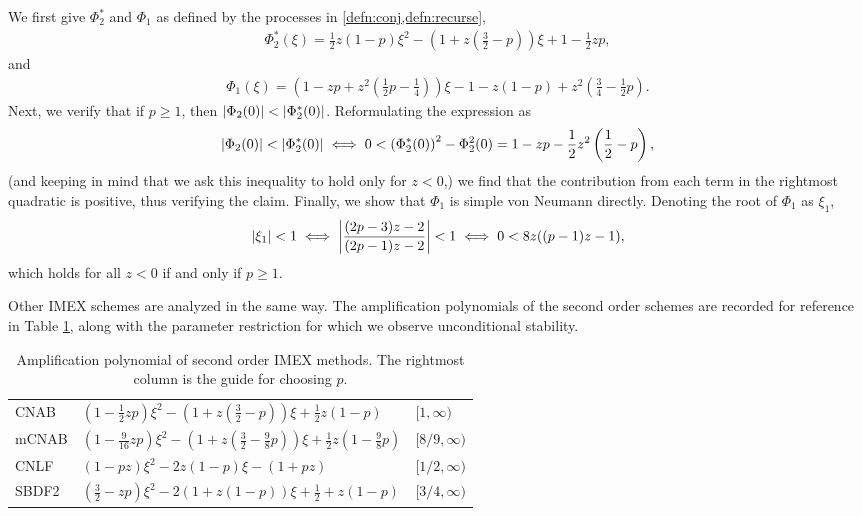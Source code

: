 We first give $\Phi_2^*$ and $\Phi_1$ as defined by the processes in \cref{defn:conj,defn:recurse},  
\begin{align}
\Phi_2^*(\xi) = \frac{1}{2}z(1-p) \xi^2 
- \left(1 + z\left(\frac{3}{2} - p \right)\right) \xi
+ 1 - \frac{1}{2}zp, 
\end{align}
and
\begin{align} 
\Phi_1(\xi) = \left(1 - zp + z^2 \left( \frac{1}{2} p - \frac{1}{4} \right) \right)\xi -1 - z(1-p) + z^2 \left( \frac{3}{4} - \frac{1}{2}p \right).
\end{align}
Next, we verify that if $p\geq 1$, then $\left|\Phi_2(0)\right| < \left|\Phi^*_2(0)\right|$. Reformulating the expression as
\begin{align*}
\left|\Phi_2(0)\right| < \left|\Phi^*_2(0)\right| 
\iff 
0 < \left(\Phi^*_2(0) \right)^2 - \Phi^2_2(0)
= 1 - zp - \frac{1}{2}z^2\left( \frac{1}{2} - p \right),
\end{align*}
(and keeping in mind that we ask this inequality to hold only for $z<0$,) we find that the contribution from each term  in the rightmost quadratic is positive, thus verifying the claim.
Finally, we show that $\Phi_1$ is simple von Neumann directly. Denoting the root of $\Phi_1$ as $\xi_1$, 
\begin{align*}
	\left|\xi_1\right| < 1 
\iff \left|\frac{(2p-3)z-2}{(2p-1)z-2}\right| < 1
\iff 0< 8z((p-1)z-1),  
\end{align*}
which holds for all $z<0$ if and only if $p\geq 1$.

Other IMEX schemes are analyzed in the same way. The amplification polynomials of the second order schemes are recorded for reference in Table \ref{table:amp poly 2}, along with the parameter restriction for which we observe unconditional stability.

\begin{table}[htb!]
	\centering
	\caption[Amplification polynomials of second order IMEX methods]{Amplification polynomial of second order IMEX methods. The rightmost column is the guide for choosing $p$.}
	\begin{tabular}{lll}
		\toprule[1.25pt] 
		\head{Method} 
		& \head{Amplification Polynomial}
		& \head{$p\lambda/\lambda\in$}
		\\	\midrule 
		CNAB 
		& $\left(1 - \frac{1}{2}zp\right)\xi^2
		- \left(1 + z\left(\frac{3}{2}-p \right)\right)\xi + \frac{1}{2}z(1-p)$
		& $[1,\infty)$
		\\[2.6pt]
		mCNAB 
		& $\left(1 - \frac{9}{16}zp \right) \xi^2 - \left(1 + z\left(\frac{3}{2} - \frac{9}{8} p \right) \right)\xi
		+ \frac{1}{2}z\left(1 - \frac{9}{8}p \right) $
		& $[8/9,\infty)$
		\\[2.6pt]
		CNLF 
		& $\left(1-pz\right) \xi^2 -2z(1-p)\xi -(1+pz)$
		& $[1/2,\infty)$
		\\[2.6pt]
		SBDF2 
		& $\left(\frac{3}{2} - zp\right) \xi^2
		- 2\left(1 + z(1-p)\right) \xi 
		+ \frac{1}{2} + z(1-p)
		$
		& $[3/4,\infty)$
		\\ \bottomrule[1.25pt]
	\end{tabular}
\label{table:amp poly 2}
\end{table}

